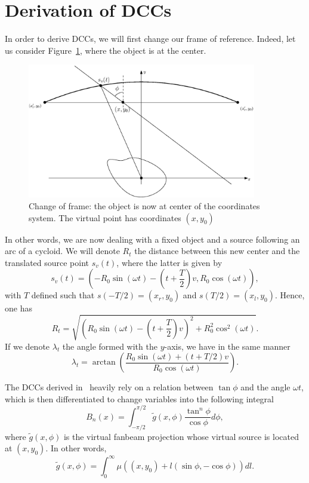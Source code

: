 \documentclass[a4paper]{article}
\numberwithin{equation}{section}
\begin{document}
\section{Derivation of DCCs}

In order to derive DCCs, we will first change our frame of reference. Indeed, let us consider Figure~\ref{fig:change_frame}, where the object is at the center.
\begin{figure}[!ht]
	\centering
	\includegraphics[width=10cm]{figs/frame_object.eps}
	\caption{Change of frame: the object is now at center of the coordinates system. The virtual point has coordinates $\left( x,y_0 \right)$\label{fig:change_frame}}
\end{figure}
In other words, we are now dealing with a fixed object and a source following an arc of a cycloid. We will denote $R_t$ the distance between this new center and the translated source point $s_v(t)$, where the latter is given by
\begin{equation}
	s_v(t) = \left( -R_0 \sin(\omega t) - \left( t + \frac{T}{2} \right)v, R_0 \cos(\omega t) \right),
\end{equation}
with $T$ defined such that $s(-T/2) = \left(x_r,y_0\right) $ and $s(T/2) = \left(x_l,y_0\right)$. Hence, one has
\begin{equation}
R_t = \sqrt{ \left( R_0 \sin(\omega t) - \left( t + \frac{T}{2} \right)v \right)^2 + R_0^2 \cos^2(\omega t) }.	
\end{equation}
If we denote $\lambda_t$ the angle formed with the $y$-axis, we have in the same manner
\begin{equation}
\lambda_t = \arctan \left( \frac{R_0 \sin(\omega t) + \left( t + T/2 \right)v}{R_0 \cos(\omega t)} \right).
\end{equation}

The DCCs derived in~\cite{clackdoyle2015consistency} heavily rely on a relation between $\tan \phi$ and the angle $\omega t$, which is then differentiated to change variables into the following integral
\begin{equation}
	B_n(x) = \int_{-\pi/2}^{\pi/2} \tilde{g}(x,\phi) \frac{\tan^n \phi}{\cos \phi} d\phi,	
	\label{eq:Bn_x_phi}
\end{equation}
where $\tilde{g}(x,\phi)$ is the virtual fanbeam projection whose virtual source is located at $(x,y_0)$. In other words,
\begin{equation}
	\tilde{g}(x,\phi) = \int_0^{\infty} \mu\left( (x,y_0) + l(\sin \phi, -\cos \phi) \right) dl.
\end{equation}
\end{document}
